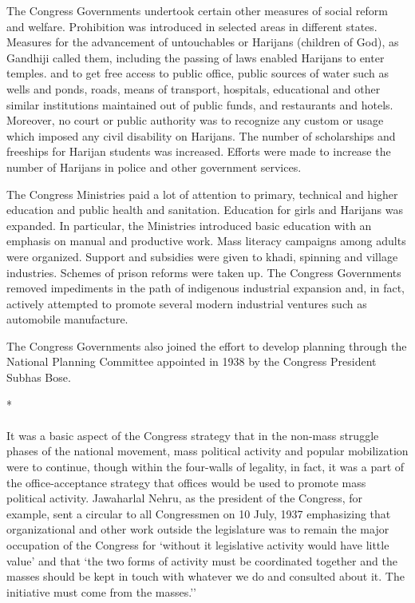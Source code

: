\begin{multicols}{2}
The Congress Governments undertook certain other measures of social reform and welfare. Prohibition was introduced in selected areas in different states. Measures for the advancement of untouchables or Harijans (children of God), as Gandhiji called them, including the passing of laws enabled Harijans to enter temples. and to get free access to public office, public sources of water such as wells and ponds, roads, means of transport, hospitals, educational and other similar institutions maintained out of public funds, and restaurants and hotels. Moreover, no court or public authority was to recognize any custom or usage which imposed any civil disability on Harijans. The number of scholarships and freeships for Harijan students was increased. Efforts were made to increase the number of Harijans in police and other government services. 

The Congress Ministries paid a lot of attention to primary, technical and higher education and public health and sanitation. Education for girls and Harijans was expanded. In particular, the Ministries introduced basic education with an emphasis on manual and productive work. Mass literacy campaigns among adults were organized. Support and subsidies were given to khadi, spinning and village industries. Schemes of prison reforms were taken up. The Congress Governments removed impediments in the path of indigenous industrial expansion and, in fact, actively attempted to promote several modern industrial ventures such as automobile manufacture. 

The Congress Governments also joined the effort to develop planning through the National Planning Committee appointed in 1938 by the Congress President Subhas Bose.

\begin{center}*\end{center}

\paragraph*{}

It was a basic aspect of the Congress strategy that in the non-mass struggle phases of the national movement, mass political activity and popular mobilization were to continue, though within the four-walls of legality, in fact, it was a part of the office-acceptance strategy that offices would be used to promote mass political activity. Jawaharlal Nehru, as the president of the Congress, for example, sent a circular to all Congressmen on 10 July, 1937 emphasizing that organizational and other work outside the legislature was to remain the major occupation of the Congress for `without it legislative activity would have little value' and that `the two forms of activity must be coordinated together and the masses should be kept in touch with whatever we do and consulted about it. The initiative must come from the masses.'' 


\end{multicols}
